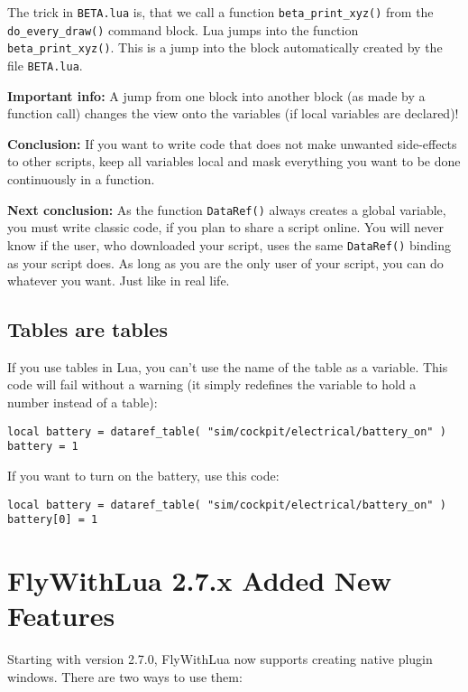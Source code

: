 \documentclass[11pt,parskip=half,a4paper]{scrartcl}
\begin{document}
The trick in \verb|BETA.lua| is, that we call a function \verb|beta_print_xyz()| from the \verb|do_every_draw()| command block. Lua jumps into the function \verb|beta_print_xyz()|. This is a jump into the block automatically created by the file \verb|BETA.lua|.

\textbf{Important info:} A jump from one block into another block (as made by a function call) changes the view onto the variables (if local variables are declared)!

\textbf{Conclusion:} If you want to write code that does not make unwanted side-effects to other scripts, keep all variables local and mask everything you want to be done continuously in a function.

\textbf{Next conclusion:} As the function \verb|DataRef()| always creates a global variable, you must write classic code, if you plan to share a script online. You will never know if the user, who downloaded your script, uses the same \verb|DataRef()| binding as your script does. As long as you are the only user of your script, you can do whatever you want. Just like in real life.

\subsection{Tables are tables}

If you use tables in Lua, you can't use the name of the table as a variable. This code will fail without a warning (it simply redefines the variable to hold a number instead of a table):

\begin{lstlisting}
local battery = dataref_table( "sim/cockpit/electrical/battery_on" )
battery = 1
\end{lstlisting}

If you want to turn on the battery, use this code:

\begin{lstlisting}
local battery = dataref_table( "sim/cockpit/electrical/battery_on" )
battery[0] = 1
\end{lstlisting}

\newpage
\section{FlyWithLua 2.7.x Added New Features}

Starting with version 2.7.0, FlyWithLua now supports creating native plugin windows. There are two ways to use them:
\end{document}
